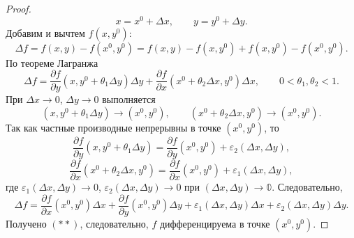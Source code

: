 \documentclass[12pt,a4paper]{report}
\begin{document}

\begin{proof}
    \[
    x=x^0+\Delta x, \qquad y=y^0+\Delta y.
    \]
    Добавим и вычтем $f(x,y^0)$:
    \[
    \Delta f=f(x,y)-f(x^0,y^0)=f(x,y)-f(x,y^0)+f(x,y^0)-f(x^0,y^0).
    \]
    По теореме Лагранжа
    \[
    \Delta f=
    \frac{\partial f}{\partial y}(x,y^0+\theta_1\Delta y)\Delta y+
    \frac{\partial f}{\partial x}(x^0+\theta_2\Delta x,y^0)\Delta x,
    \qquad 0<\theta_1,\theta_2<1.
    \]
    При $\Delta x\to0$, $\Delta y\to0$ выполняется
    \[
    (x,y^0+\theta_1\Delta y)\to(x^0,y^0), \qquad
    (x^0+\theta_2\Delta x,y^0)\to(x^0,y^0).
    \]
    Так как частные производные непрерывны в точке $(x^0,y^0)$, то
    \[
    \frac{\partial f}{\partial y}(x,y^0+\theta_1\Delta y)
    =\frac{\partial f}{\partial y}(x^0,y^0)+\varepsilon_2(\Delta x,\Delta y),
    \]
    \[
    \frac{\partial f}{\partial x}(x^0+\theta_2\Delta x,y^0)
    =\frac{\partial f}{\partial x}(x^0,y^0)+\varepsilon_1(\Delta x,\Delta y),
    \]
    где $\varepsilon_1(\Delta x,\Delta y)\to0$, $\varepsilon_2(\Delta x,\Delta y)\to0$ при $(\Delta x,\Delta y)\to\mathbb 0$. Следовательно,
    \[
    \Delta f=
    \frac{\partial f}{\partial x}(x^0,y^0)\Delta x+
    \frac{\partial f}{\partial y}(x^0,y^0)\Delta y+
    \varepsilon_1(\Delta x,\Delta y)\Delta x+
    \varepsilon_2(\Delta x,\Delta y)\Delta y.
    \]
    Получено $(**)$, следовательно, $f$ дифференцируема в точке $(x^0,y^0)$.
\end{proof}


\end{document}
